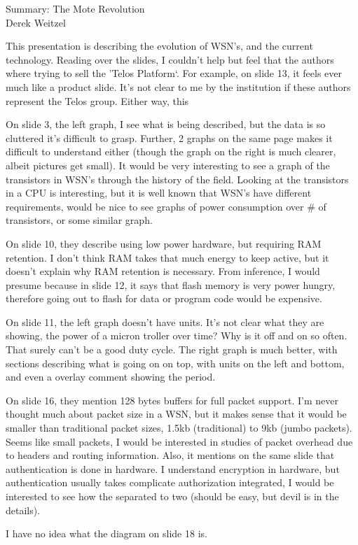\documentclass[12pt]{article}
\begin{document}
\begin{center}
{\huge Summary: The Mote Revolution } \\
Derek Weitzel
\end{center}


This presentation is describing the evolution of WSN's, and the current technology.  Reading over the slides, I couldn't help but feel that the authors where trying to sell the 'Telos Platform`.  For example, on slide 13, it feels ever much like a product slide.  It's not clear to me by the institution if these authors represent the Telos group.  Either way, this 

On slide 3, the left graph, I see what is being described, but the data is so cluttered it's difficult to grasp.  Further, 2 graphs on the same page makes it difficult to understand either (though the graph on the right is much clearer, albeit pictures get small).  It would be very interesting to see a graph of the transistors in WSN's through the history of the field.  Looking at the transistors in a CPU is interesting, but it is well known that WSN's have different requirements, would be nice to see graphs of power consumption over \# of transistors, or some similar graph.  

On slide 10, they describe using low power hardware, but requiring RAM retention.  I don't think RAM takes that much energy to keep active, but it doesn't explain why RAM retention is necessary.  From inference, I would presume because in slide 12, it says that flash memory is very power hungry, therefore going out to flash for data or program code would be expensive.

On slide 11, the left graph doesn't have units.  It's not clear what they are showing, the power of a micron troller over time?  Why is it off and on so often.  That surely can't be a good duty cycle.  The right graph is much better, with sections describing what is going on on top, with units on the left and bottom, and even a overlay comment showing the period.

On slide 16, they mention 128 bytes buffers for full packet support.  I'm never thought much about packet size in a WSN, but it makes sense that it would be smaller than traditional packet sizes, 1.5kb (traditional) to 9kb (jumbo packets).   Seems like small packets, I would be interested in studies of packet overhead due to headers and routing information.  Also, it mentions on the same slide that authentication is done in hardware.  I understand encryption in hardware, but authentication usually takes complicate authorization integrated, I would be interested to see how the separated to two (should be easy, but devil is in the details).  

I have no idea what the diagram on slide 18 is.  
\end{document}
